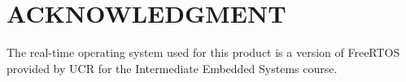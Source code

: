 \documentclass[letterpaper, 10 pt, conference]{ieeeconf}  %
\begin{document}
\section*{ACKNOWLEDGMENT}

The real-time operating system used for this product is a version of FreeRTOS provided by UCR for the Intermediate Embedded Systems course.

\end{document}

